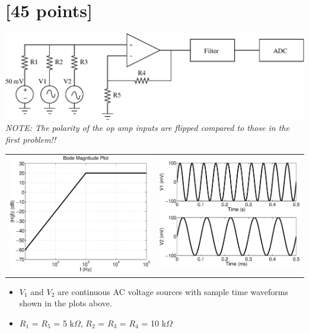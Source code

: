 \documentclass[12pt]{article}
\begin{document}


\section{[45 points]}

\begin{center}
\includegraphics[width=0.75\linewidth]{sum_filt_adc.eps}\\

\emph{NOTE: The polarity of the op amp inputs are flipped compared to those in the first problem!!}

\begin{tabular}{cc}
\includegraphics[width=0.4\linewidth]{bode_plot.eps} & 
\includegraphics[width=0.4\linewidth]{sum_filt_adc_v1_v2.eps}\\
\end{tabular}


\end{center}

\begin{itemize}
\item $V_1$ and $V_2$ are continuous AC voltage sources with sample time waveforms shown in the plots above.
\item $R_1$ = $R_5$ = 5 k$\Omega$, $R_2$ = $R_3$ = $R_4$ = 10 k$\Omega$
\end{itemize}
\end{document}
